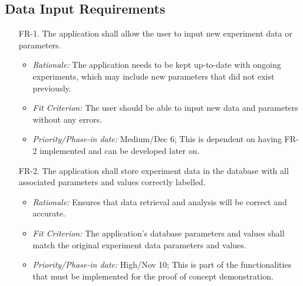 \documentclass[12pt]{article}
\begin{document}
\subsection{Data Input Requirements}
  \begin{enumerate}
    \item[FR-1.] The application shall allow the user to input new experiment data or parameters.
    \begin{itemize}
    \item \textit{Rationale:} The application needs to be kept up-to-date with ongoing experiments, which may include new parameters that did not exist previously.
    \item \textit{Fit Criterion:} The user should be able to input new data and parameters without any errors.
    \item \textit{Priority/Phase-in date:} Medium/Dec 6; This is dependent on having FR-2 implemented and can be developed later on.
    \end{itemize}
    \item[FR-2.] The application shall store experiment data in the database with all associated parameters and values correctly labelled.
    \begin{itemize}
      \item \textit{Rationale:} Ensures that data retrieval and analysis will be correct and accurate.
      \item \textit{Fit Criterion:} The application's database parameters and values shall match the original experiment data parameters and values.
      \item \textit{Priority/Phase-in date:} High/Nov 10; This is part of the functionalities that must be implemented for the proof of concept demonstration.
    \end{itemize}
  \end{enumerate}
\end{document}
